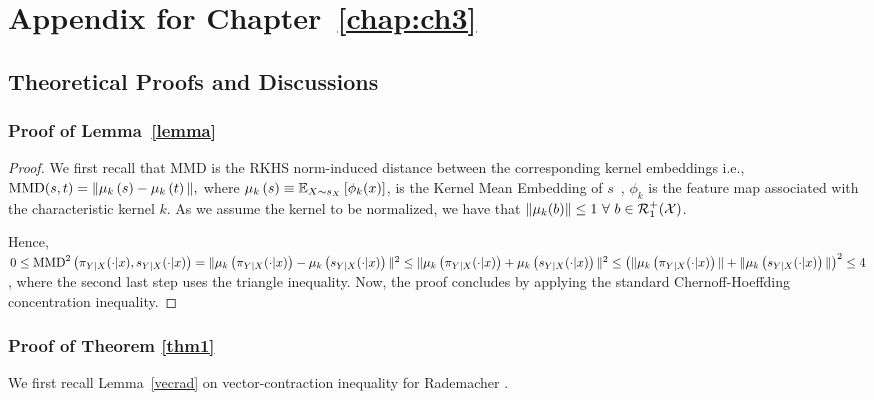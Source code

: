 \renewcommand{\thechapter}{C}
\chapter{Appendix for Chapter~\ref{chap:ch3}}\label{APP:C}

\renewcommand{\thesection}{C.\arabic{section}}
\renewcommand{\thesubsection}{C.\arabic{section}.\arabic{subsection}}
\renewcommand{\thefigure}{C.\arabic{figure}}
\renewcommand{\thetable}{C.\arabic{table}}
\renewcommand{\theequation}{C.\arabic{equation}}

\section{Theoretical Proofs and Discussions}
\subsection[Consistency Proof for the Estimator of the MMD Regularization Terms]{Proof of Lemma~\ref{lemma}}\label{cot:lemma1}
\lemmaone*

\begin{proof}
We first recall that MMD is the RKHS norm-induced distance between the corresponding kernel embeddings i.e., $\textup{MMD}(s,t)=\|\mu_k\left(s\right)-\mu_k\left(t\right)\|,$ where $\mu_k\left(s\right)\equiv \mathbb{E}_{X\sim s_X}\left[\phi_k(x)\right]$, is the Kernel Mean Embedding of $s$~\citep{Muandet_2017}, $\phi_k$ is the feature map associated with the characteristic kernel $k$. As we assume the kernel to be normalized, we have that $\|\mu_k(b)\|\le1\ \forall\ b\in\mathcal{R}_1^+(\calX)$. 

Hence, $0\leq \textup{MMD}^2\left(\pi_{Y|X}(\cdot|x), s_{Y|X}(\cdot|x)\right)=\|\mu_k\left(\pi_{Y|X}(\cdot|x)\right)-\mu_k\left(s_{Y|X}(\cdot|x)\right)\|^2\leq\|\mu_k\left(\pi_{Y|X}(\cdot|x)\right)+\mu_k\left(s_{Y|X}(\cdot|x)\right)\|^2\leq \left(\|\mu_k\left(\pi_{Y|X}(\cdot|x)\right)\|+\|\mu_k\left(s_{Y|X}(\cdot|x)\right)\|\right)^2 \le4$, where the second last step uses the triangle inequality. Now, the proof concludes by applying the standard Chernoff-Hoeffding concentration inequality.
\end{proof}

\subsection[Consistency Proof for the Estimator of the Proposed Conditional OT Formulation]{Proof of Theorem \ref{thm1}}\label{app:consistency}
We first recall Lemma~\ref{vecrad} on vector-contraction inequality for Rademacher \cite[Corollary (4)]{rad}.
\Restated*

